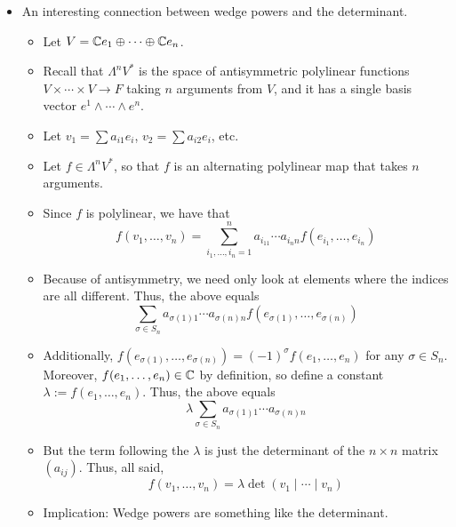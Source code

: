 \documentclass[../notes.tex]{subfiles}
\begin{document}
\begin{itemize}
\begin{itemize}
\begin{proof}
        \end{proof}
    \end{itemize}
    \item An interesting connection between wedge powers and the determinant.
    \begin{itemize}
        \item Let $V=\mathbb{C} e_1\oplus\cdots\oplus\mathbb{C} e_n$.
        \item Recall that $\Lambda^nV^*$ is the space of antisymmetric polylinear functions $V\times\cdots\times V\to F$ taking $n$ arguments from $V$, and it has a single basis vector $e^1\wedge\cdots\wedge e^n$.
        \item Let $v_1=\sum a_{i1}e_i$, $v_2=\sum a_{i2}e_i$, etc.
        \item Let $f\in\Lambda^nV^*$, so that $f$ is an alternating polylinear map that takes $n$ arguments.
        \item Since $f$ is polylinear, we have that
        \begin{equation*}
            f(v_1,\dots,v_n) = \sum_{i_1,\dots,i_n=1}^na_{i_11}\cdots a_{i_nn}f(e_{i_1},\dots,e_{i_n})
        \end{equation*}
        \item Because of antisymmetry, we need only look at elements where the indices are all different. Thus, the above equals
        \begin{equation*}
            \sum_{\sigma\in S_n}a_{\sigma(1)1}\cdots a_{\sigma(n)n}f(e_{\sigma(1)},\dots,e_{\sigma(n)})
        \end{equation*}
        \item Additionally, $f(e_{\sigma(1)},\dots,e_{\sigma(n)})=(-1)^\sigma f(e_1,\dots,e_n)$ for any $\sigma\in S_n$. Moreover, $f(e_1,\dots,e_n)\in\mathbb{C}$ by definition, so define a constant $\lambda:=f(e_1,\dots,e_n)$. Thus, the above equals
        \begin{equation*}
            \lambda\sum_{\sigma\in S_n}a_{\sigma(1)1}\cdots a_{\sigma(n)n}
        \end{equation*}
        \item But the term following the $\lambda$ is just the determinant of the $n\times n$ matrix $(a_{ij})$. Thus, all said,
        \begin{equation*}
            f(v_1,\dots,v_n) = \lambda\det(v_1\mid\cdots\mid v_n)
        \end{equation*}
        \item Implication: Wedge powers are something like the determinant.
        \begin{itemize}

\end{itemize}
\end{itemize}
\end{itemize}
\end{document}
